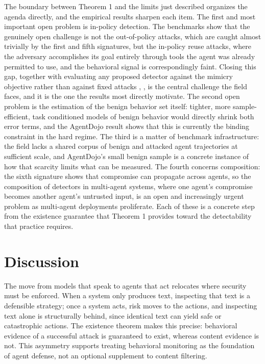 \documentclass[journal]{IEEEtran}
\theoremstyle{remark}
\begin{document}
The boundary between Theorem 1 and the limits just described organizes the agenda directly, and the empirical results sharpen each item. The first and most important open problem is in-policy detection. The benchmarks show that the genuinely open challenge is not the out-of-policy attacks, which are caught almost trivially by the first and fifth signatures, but the in-policy reuse attacks, where the adversary accomplishes its goal entirely through tools the agent was already permitted to use, and the behavioral signal is correspondingly faint. Closing this gap, together with evaluating any proposed detector against the mimicry objective rather than against fixed attacks \cite{r5}, \cite{r30}, is the central challenge the field faces, and it is the one the results most directly motivate. The second open problem is the estimation of the benign behavior set itself: tighter, more sample-efficient, task conditioned models of benign behavior would directly shrink both error terms, and the AgentDojo result shows that this is currently the binding constraint in the hard regime. The third is a matter of benchmark infrastructure: the field lacks a shared corpus of benign and attacked agent trajectories at sufficient scale, and AgentDojo's small benign sample is a concrete instance of how that scarcity limits what can be measured. The fourth concerns composition: the sixth signature shows that compromise can propagate across agents, so the composition of detectors in multi-agent systems, where one agent's compromise becomes another agent's untrusted input, is an open and increasingly urgent problem as multi-agent deployments proliferate. Each of these is a concrete step from the existence guarantee that Theorem 1 provides toward the detectability that practice requires.

\section{Discussion}

The move from models that speak to agents that act relocates where security must be enforced. When a system only produces text, inspecting that text is a defensible strategy; once a system acts, risk moves to the actions, and inspecting text alone is structurally behind, since identical text can yield safe or catastrophic actions. The existence theorem makes this precise: behavioral evidence of a successful attack is guaranteed to exist, whereas content evidence is not. This asymmetry supports treating behavioral monitoring as the foundation of agent defense, not an optional supplement to content filtering.
\end{document}
